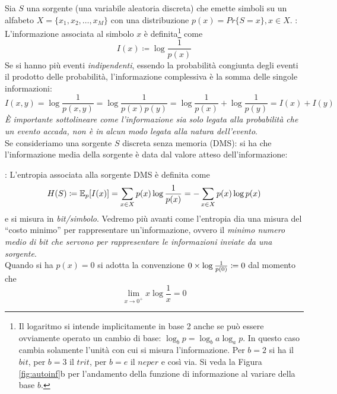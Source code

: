 Sia $S$ una sorgente (una variabile aleatoria discreta) che emette simboli su un alfabeto $X=\{x_1, x_2, \dots, x_M\}$ con una distribuzione $p(x) = Pr\{S=x\}, x\in X$.
: L'informazione associata al simbolo $x$ \`e definita\footnote{Il logaritmo si intende implicitamente in base 2 anche se pu\`o essere ovviamente operato un cambio di base: $\log_b p = \log_b a \log_a p$. In questo caso cambia solamente l'unit\`a con cui si misura l'informazione. Per $b=2$ si ha il $bit$, per $b=3$ il $trit$, per $b=e$ il $neper$ e cos\`i via. Si veda la Figura \ref{fig:autoinf}b per l'andamento della funzione di informazione al variare della base $b$.} come 
\begin{equation}
I(x) \coloneqq \log \frac{1}{p(x)}
\end{equation}
Se si hanno più eventi \textit{indipendenti}, essendo la probabilità congiunta degli eventi il prodotto delle probabilità, l’informazione complessiva è la somma delle singole informazioni:
\begin{equation}
I(x, y) = \log \frac{1}{p(x,y)} = \log \frac{1}{p(x)p(y)} = \log \frac{1}{p(x)} + \log \frac{1}{p(y)} = I(x) + I(y)
\end{equation}
\textit{\`E importante sottolineare come l’informazione sia solo legata alla probabilità  che un evento accada, non è in alcun modo legata alla natura dell'evento}. \\
Se consideriamo una sorgente $S$ discreta senza memoria (DMS): si ha che l'informazione media della sorgente \`e data dal valore atteso dell'informazione:

: L'entropia associata alla sorgente DMS \`e definita come
\begin{equation}
H(S) \coloneqq \mathbb{E}_p [I(x)] =  \sum_{x \in X} p(x) \log \frac{1}{p({x})} = - \sum_{x \in X} p(x) \log p(x)
\end{equation}
e si misura in \textit{bit/simbolo}. Vedremo pi\`u avanti come l’entropia dia una misura del “costo minimo” per rappresentare un’informazione, ovvero il \textit{minimo numero medio di bit che servono per rappresentare le informazioni inviate da una sorgente}. \\
Quando si ha $p(x)=0$ si adotta la convenzione $0 \times \log \frac{1}{p({0})} \coloneqq 0$ dal momento che 
\begin{equation}
\lim_{x\to0^+} x \log \frac{1}{x} = 0
\end{equation}

